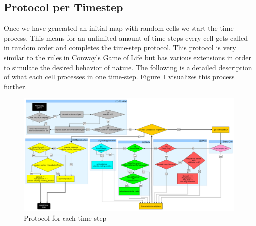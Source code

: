 \documentclass[11pt]{article}
\begin{document}
\subsection{Protocol per Timestep}
Once we have generated an initial map with random cells we start the time process. This means for an unlimited amount of time steps every cell gets called in random order and completes the time-step protocol. This protocol is very similar to the rules in Conway's Game of Life but has various extensions in order to simulate the desired behavior of nature. The following is a detailed description of what each cell processes in one time-step. Figure \ref{fig:protocol} visualizes this process further.

\thispagestyle{empty}
\begin{figure}[p]
\centering
\vspace*{-2cm}
\includegraphics[angle=90,scale=0.34]{DayProtocol.png}
\caption{Protocol for each time-step}
\label{fig:protocol}
\end{figure}


\setcounter{protocolCounter}{1}
\end{document}
